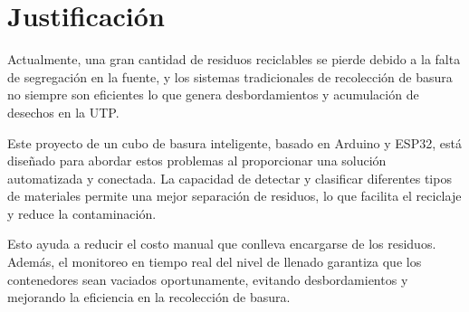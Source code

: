 \section{Justificación}
Actualmente, una gran cantidad de residuos reciclables se pierde debido a la falta de segregación en la fuente, y los sistemas tradicionales de recolección de basura no siempre son eficientes lo que genera desbordamientos y acumulación de desechos en la UTP.

Este proyecto de un cubo de basura inteligente, basado en Arduino y ESP32, está diseñado para abordar estos problemas al proporcionar una solución automatizada y conectada. La capacidad de detectar y clasificar diferentes tipos de materiales permite una mejor separación de residuos, lo que facilita el reciclaje y reduce la contaminación.

Esto ayuda a reducir el costo manual que conlleva encargarse de los residuos. Además, el monitoreo en tiempo real del nivel de llenado garantiza que los contenedores sean vaciados oportunamente, evitando desbordamientos y mejorando la eficiencia en la recolección de basura.